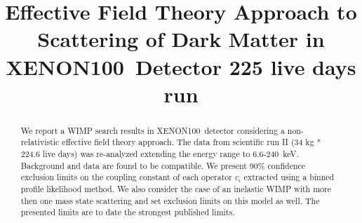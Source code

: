 \documentclass[twocolumn, showpacs, showkeys, amsmath, amssymb, amsfonts, floatfix, linenumbers]{revtex4-1}
\newcommand{\Xehund}{{XENON100}}
\begin{document}

\title{Effective Field Theory Approach to Scattering of Dark Matter in  \Xehund\ Detector 225 live days run}
%


\begin{abstract} 

We report a WIMP search results in \Xehund\ detector considering a non-relativistic effective field theory approach.  The data from scientific run II (34 kg * 224.6 live days) was re-analyzed extending the energy range to 6.6-240~keV. Background and data are found to be compatible. We present 90\% confidence exclusion limits on the coupling constant of each operator $c_i$ extracted using a binned profile likelihood method. We also consider the case of an inelastic WIMP with more then one mass state scattering and set exclusion limits on this model as well. The presented limits are to date the strongest published limits. 
\end{abstract}

\pacs{}

\maketitle 













\appendix



%


\end{document}
